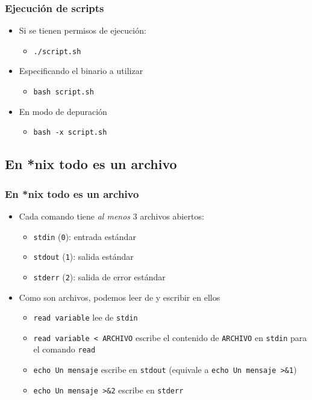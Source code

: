 \begin{frame}
  \frametitle{Ejecución de scripts}
  \begin{itemize}
    \item Si se tienen permisos de ejecución:
    \begin{itemize}
      \item \texttt{./script.sh}
    \end{itemize}
    \item Especificando el binario a utilizar
    \begin{itemize}
      \item \texttt{bash script.sh}
    \end{itemize}
    \item En modo de depuración
    \begin{itemize}
      \item \texttt{bash -x script.sh}
    \end{itemize}
  \end{itemize}
\end{frame}

\subsection{En *nix todo es un archivo}

\begin{frame}
  \frametitle{En *nix todo es un archivo}
  \begin{itemize}
    \item Cada comando tiene \textit{al menos} 3 archivos abiertos:
    \begin{itemize}
      \item \texttt{stdin} (\texttt{0}): entrada estándar
      \item \texttt{stdout} (\texttt{1}): salida estándar
      \item \texttt{stderr} (\texttt{2}): salida de error estándar
    \end{itemize}
    \item Como son archivos, podemos leer de y escribir en ellos
    \begin{itemize}
      \item \texttt{read variable} lee de \texttt{stdin}
      \item \texttt{read variable < ARCHIVO} escribe el contenido de \texttt{ARCHIVO} en \texttt{stdin}
        para el comando \texttt{read}
      \item \texttt{echo Un mensaje} escribe en \texttt{stdout} (equivale a \texttt{echo Un mensaje >\&1})
      \item \texttt{echo Un mensaje >\&2} escribe en \texttt{stderr}
    \end{itemize}
  \end{itemize}
\end{frame}

